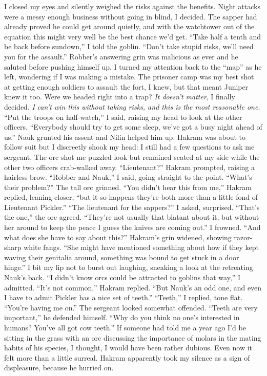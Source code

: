 \documentclass[12pt, openany]{book}
\begin{document}
I closed my eyes and silently weighed the risks against the benefits. Night attacks were a messy enough business without going in blind, I decided. The sapper had already proved he could get around quietly, and with the watchtower out of the equation this might very well be the best chance we’d get.
“Take half a tenth and be back before sundown,” I told the goblin. “Don’t take stupid risks, we’ll need you for the assault.”
Robber’s answering grin was malicious as ever and he saluted before pushing himself up. I turned my attention back to the “map” as he left, wondering if I was making a mistake. The prisoner camp was my best shot at getting enough soldiers to assault the fort, I knew, but that meant Juniper knew it too. Were we headed right into a trap? \textit{It doesn’t matter}, I finally decided. \textit{I} \textit{can’t win this without taking risks, and this is the most reasonable one.}
“Put the troops on half-watch,” I said, raising my head to look at the other officers. “Everybody should try to get some sleep, we’ve got a busy night ahead of us.”
Nauk grunted his assent and Nilin helped him up. Hakram was about to follow suit but I discreetly shook my head: I still had a few questions to ask me sergeant. The orc shot me puzzled look but remained seated at my side while the other two officers crab-walked away.
“Lieutenant?” Hakram prompted, raising a hairless brow.
“Robber and Nauk,” I said, going straight to the point. “What’s their problem?”
The tall orc grinned.
“You didn’t hear this from me,” Hakram replied, leaning closer, “but it so happens they’re both more than a little fond of Lieutenant Pickler.”
“The lieutenant for the sappers?” I asked, surprised.
“That’s the one,” the orc agreed. “They’re not usually that blatant about it, but without her around to keep the peace I guess the knives are coming out.”
I frowned.
“And what does she have to say about this?”
Hakram’s grin widened, showing razor-sharp white fangs.
“She might have mentioned something about how if they kept waving their genitalia around, something was bound to get stuck in a door hinge.”
I bit my lip not to burst out laughing, sneaking a look at the retreating Nauk’s back.
“I didn’t know orcs could be attracted to goblins that way,” I admitted.
“It’s not common,” Hakram replied. “But Nauk’s an odd one, and even I have to admit Pickler has a nice set of teeth.”
“Teeth,” I replied, tone flat. “You’re having me on.”
The sergeant looked somewhat offended.
“Teeth are very important,” he defended himself. “Why do you think no one’s interested in humans? You’ve all got cow teeth.”
If someone had told me a year ago I’d be sitting in the grass with an orc discussing the importance of molars in the mating habits of his species, I thought, I would have been rather dubious. Even now it felt more than a little surreal. Hakram apparently took my silence as a sign of displeasure, because he hurried on.
\end{document}
